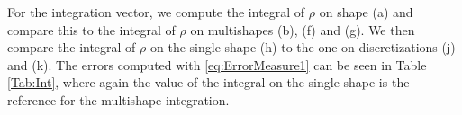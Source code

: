 For the integration vector, we compute the integral of $\rho$ on shape (a) and compare this to the integral of $\rho$ on multishapes (b), (f) and (g). We then compare the integral of $\rho$ on the single shape (h) to the one on discretizations (j) and (k). The errors computed with \eqref{eq:ErrorMeasure1} can be seen in Table \ref{Tab:Int}, where again the value of the integral on the single shape is the reference for the multishape integration.










